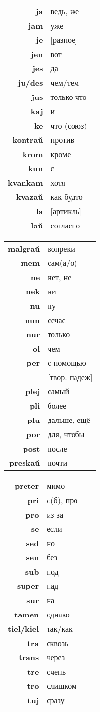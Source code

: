 \documentclass{article}
\begin{document}
\hspace{-3em}
\begin{tabular}{>{\bfseries}rl}
\hline
ja & ведь, же \\
jam & уже \\
je & {}[разное] \\
jen & вот \\
jes & да \\
ju/des & чем/тем \\
ĵus & только что \\
kaj & и \\
ke & что (союз) \\
kontraŭ & против \\
krom & кроме \\
kun & с \\
kvankam & хотя \\
kvazaŭ & как будто \\
la & {}[артикль] \\
laŭ & согласно \\
\hline
\end{tabular}
\hspace{-1em}
\begin{tabular}{>{\bfseries}rl}
\hline
malgraŭ & вопреки \\
mem & сам(а/о) \\
ne & нет, не \\
nek & ни \\
nu & ну \\
nun & сечас \\
nur & только \\
ol & чем \\
per & с помощью \\
~ & {}[твор. падеж] \\
plej & самый \\
pli & более \\
plu & дальше, ещё \\
por & для, чтобы \\
post & после \\
preskaŭ & почти \\
\hline
\end{tabular}
\hspace{-1em}
\begin{tabular}{>{\bfseries}rl|}
\hline
preter & мимо \\
pri & o(б), про \\
pro & из-за \\
se & если \\
sed & но \\
sen & без \\
sub & под \\
super & над \\
sur & на \\
tamen & однако \\
tiel/kiel & так/как \\
tra & сквозь \\
trans & через \\
tre & очень \\
tro & слишком \\
tuj & сразу \\
\hline
\end{tabular}
\end{document}
